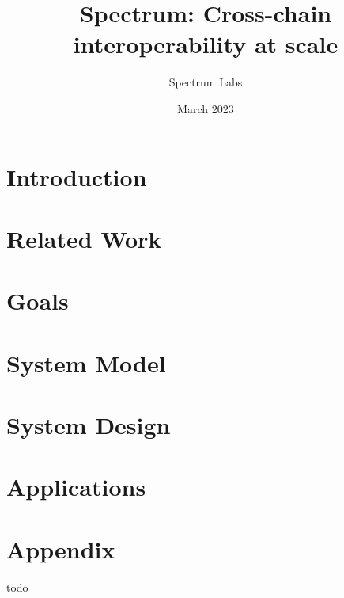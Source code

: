 \documentclass{article}
\title{Spectrum: Cross-chain interoperability at scale}
\author{Spectrum Labs}
\date{March 2023}
\begin{document}
    \begin{sloppypar}
        \maketitle


        \section{Introduction}\label{sec:introduction}
        


        \section{Related Work}\label{sec:related-work}
        


        \section{Goals}\label{sec:goals}
        


        \section{System Model}\label{sec:system-model}
        


        \section{System Design}\label{sec:system-design}
        


        \section{Applications}\label{sec:applications}
        


        \section{Appendix}\label{sec:appendix}
        todo

        \newpage
        \printbibliography

    \end{sloppypar}
\end{document}
